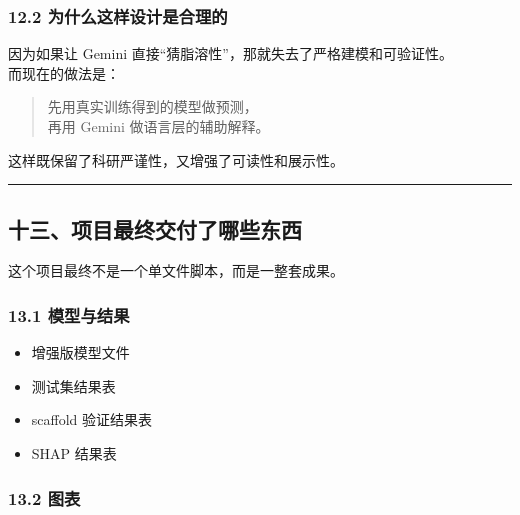 \documentclass[
  ,
]{ctexart}
\providecommand{\tightlist}{%
  \setlength{\itemsep}{0pt}\setlength{\parskip}{0pt}}
\begin{document}
\hypertarget{ux4e3aux4ec0ux4e48ux8fd9ux6837ux8bbeux8ba1ux662fux5408ux7406ux7684}{%
\subsubsection{12.2
为什么这样设计是合理的}\label{ux4e3aux4ec0ux4e48ux8fd9ux6837ux8bbeux8ba1ux662fux5408ux7406ux7684}}

因为如果让 Gemini 直接``猜脂溶性''，那就失去了严格建模和可验证性。\\
而现在的做法是：

\begin{quote}
先用真实训练得到的模型做预测，\\
再用 Gemini 做语言层的辅助解释。
\end{quote}

这样既保留了科研严谨性，又增强了可读性和展示性。

\begin{center}\rule{0.5\linewidth}{0.5pt}\end{center}

\hypertarget{ux5341ux4e09ux9879ux76eeux6700ux7ec8ux4ea4ux4ed8ux4e86ux54eaux4e9bux4e1cux897f}{%
\subsection{十三、项目最终交付了哪些东西}\label{ux5341ux4e09ux9879ux76eeux6700ux7ec8ux4ea4ux4ed8ux4e86ux54eaux4e9bux4e1cux897f}}

这个项目最终不是一个单文件脚本，而是一整套成果。

\hypertarget{ux6a21ux578bux4e0eux7ed3ux679c}{%
\subsubsection{13.1 模型与结果}\label{ux6a21ux578bux4e0eux7ed3ux679c}}

\begin{itemize}
\tightlist
\item
  增强版模型文件
\item
  测试集结果表
\item
  scaffold 验证结果表
\item
  SHAP 结果表
\end{itemize}

\hypertarget{ux56feux8868}{%
\subsubsection{13.2 图表}\label{ux56feux8868}}
\end{document}
